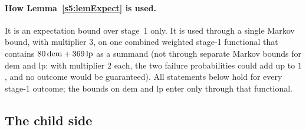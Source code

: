 \paragraph{How Lemma~\ref{s5:lemExpect} is used.} It is an expectation bound over stage~1 only. It is used through a single Markov bound, with multiplier $3$, on one combined weighted stage-1 functional that contains $80\,\mathrm{dem}+369\,\mathrm{lp}$ as a summand (not through separate Markov bounds for $\mathrm{dem}$ and $\mathrm{lp}$: with multiplier $2$ each, the two failure probabilities could add up to $1$, and no outcome would be guaranteed). All statements below hold for every stage-1 outcome; the bounds on $\mathrm{dem}$ and $\mathrm{lp}$ enter only through that functional.

\subsection{The child side}

